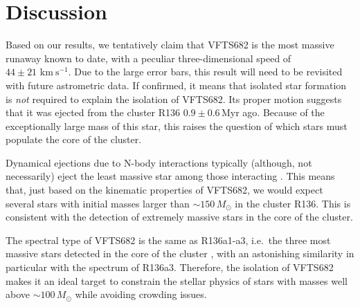 \documentclass[apjl,twocolumn]{emulateapj}
\newcommand{\kms}{{\,\mathrm{km\ s^{-1}}}}
\begin{document}
\section{Discussion}
\label{sec:discussion}

Based on our results, we tentatively claim that VFTS682 is the most massive
runaway known to date, with a peculiar three-dimensional speed of
$44\pm21\,\kms$. Due to the large error bars, this result will need
to be revisited with future astrometric data. %
If confirmed, it means that isolated star formation is
\emph{not} required to explain the isolation of VFTS682. Its proper motion suggests that it was ejected from the cluster R136
$0.9\pm0.6$\,Myr ago. Because of the exceptionally large mass
of this star, this raises the question of which stars must populate
the core of the cluster.

Dynamical ejections due to N-body interactions typically (although, not necessarily) eject the least
massive star among those interacting \cite[e.g.,][]{banerjee:12}. This means that, just
based on the kinematic properties of VFTS682, we would expect several
stars with initial masses larger than $\sim$$150\,M_\odot$ in the
cluster R136.
This is consistent with the detection
of extremely massive stars in the core of the
cluster. %

The spectral type of VFTS682
\citep[WNh5,][]{bestenlehner:11} is the same as R136a1-a3, i.e.~the
three most massive stars detected in the core of the cluster%
, with an astonishing similarity in particular with
the spectrum of R136a3. Therefore, the isolation of
VFTS682 makes it an ideal target to constrain the stellar physics of
stars with masses well above $\sim$$100\,M_\odot$ while avoiding
crowding issues. %
\end{document}
